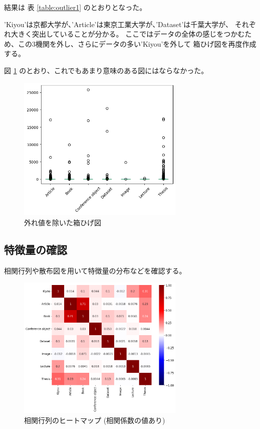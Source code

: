 \documentclass[submit,noauthor]{ono}
\begin{document}
結果は
表 \ref{table:outlier1}
のとおりとなった。

'Kiyou'は京都大学が、'Article'は東京工業大学が、'Dataset'は千葉大学が、
それぞれ大きく突出していることが分かる。
ここではデータの全体の感じをつかむため、この3機関を外し、さらにデータの多い'Kiyou'を外して
箱ひげ図を再度作成する。

図 \ref{fig:box2} のとおり、これでもあまり意味のある図にはならなかった。

\begin{figure}[h]
	\includegraphics[width=8cm]{./picture/box2.png}
	\caption{外れ値を除いた箱ひげ図}
	\label{fig:box2}
\end{figure}

\subsection{特徴量の確認}

相関行列や散布図を用いて特徴量の分布などを確認する。

\begin{figure}[h]
	\includegraphics[width=8cm]{./picture/heatmap.png}
	\caption{相関行列のヒートマップ (相関係数の値あり)}
	\label{fig:heatmap12}
\end{figure}
\end{document}
